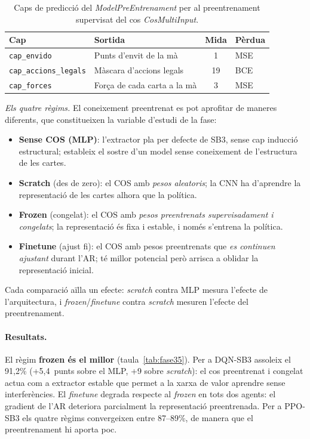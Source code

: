 \begin{table}[H]
  \centering
  \begin{tabular}{llcl}
    \toprule
    Cap & Sortida & Mida & Pèrdua \\
    \midrule
    \texttt{cap\_envido}          & Punts d'envit de la mà      & 1  & MSE \\
    \texttt{cap\_accions\_legals} & Màscara d'accions legals    & 19 & BCE \\
    \texttt{cap\_forces}          & Força de cada carta a la mà & 3  & MSE \\
    \bottomrule
  \end{tabular}
  \caption{Caps de predicció del \emph{ModelPreEntrenament} per al preentrenament
           supervisat del cos \emph{CosMultiInput}.}
  \label{tab:caps-preentrenament}
\end{table}

\emph{Els quatre règims.} El coneixement preentrenat es pot aprofitar de maneres
diferents, que constitueixen la variable d'estudi de la fase:
\begin{itemize}
  \item \textbf{Sense COS (MLP)}: l'extractor pla per defecte de \ac{SB3}, sense cap
        inducció estructural; estableix el sostre d'un model sense coneixement de
        l'estructura de les cartes.
  \item \textbf{Scratch} (des de zero): el COS amb \emph{pesos aleatoris}; la \ac{CNN} ha
        d'aprendre la representació de les cartes alhora que la política.
  \item \textbf{Frozen} (congelat): el COS amb \emph{pesos preentrenats supervisadament i
        congelats}; la representació és fixa i estable, i només s'entrena la política.
  \item \textbf{Finetune} (ajust fi): el COS amb pesos preentrenats que \emph{es continuen
        ajustant} durant l'\ac{AR}; té millor potencial però arrisca a oblidar la
        representació inicial.
\end{itemize}
Cada comparació aïlla un efecte: \emph{scratch} contra \ac{MLP} mesura l'efecte de
l'arquitectura, i \emph{frozen}/\emph{finetune} contra \emph{scratch} mesuren l'efecte del
preentrenament.

\paragraph{Resultats.} El règim \textbf{frozen és el millor}
(taula~\ref{tab:fase35}). Per a DQN-SB3 assoleix el 91{,}2\% (+5{,}4~punts sobre el
\ac{MLP}, +9 sobre \emph{scratch}): el cos preentrenat i congelat actua com a extractor
estable que permet a la xarxa de valor aprendre sense interferències. El \emph{finetune}
degrada respecte al \emph{frozen} en tots dos agents: el gradient de l'\ac{AR} deteriora
parcialment la representació preentrenada. Per a PPO-SB3 els quatre règims convergeixen
entre 87--89\%, de manera que el preentrenament hi aporta poc.

